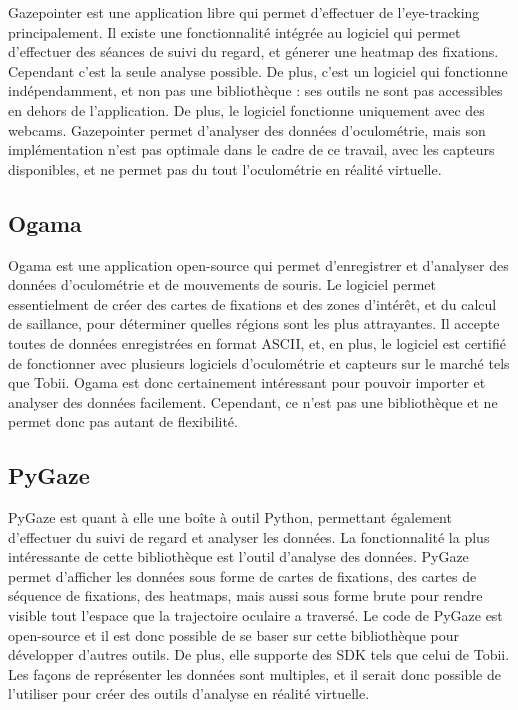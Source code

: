 \documentclass[hidelinks,12pt]{article}
\begin{document}
Gazepointer \cite{gazepointer} est une application libre qui permet d'effectuer
de l'eye-tracking principalement. Il existe une fonctionnalité intégrée au
logiciel qui permet d'effectuer des séances de suivi du regard, et génerer une
heatmap des fixations. Cependant c'est la seule analyse possible. De plus,
c'est un logiciel qui fonctionne indépendamment, et non pas une bibliothèque :
ses outils ne sont pas accessibles en dehors de l'application. De plus, le
logiciel fonctionne uniquement avec des webcams. Gazepointer permet d'analyser
des données d'oculométrie, mais son implémentation n'est pas optimale dans le
cadre de ce travail, avec les capteurs disponibles, et ne permet pas du tout
l'oculométrie en réalité virtuelle.

\subsection{Ogama}

Ogama \cite{ogama} est une application open-source qui permet d'enregistrer et
d'analyser des données d'oculométrie et de mouvements de souris. Le logiciel
permet essentielment de créer des cartes de fixations et des zones d'intérêt,
et du calcul de saillance, pour déterminer quelles régions sont les plus
attrayantes. Il accepte toutes de données enregistrées en format ASCII, et, en
plus, le logiciel est certifié de fonctionner avec plusieurs logiciels
d'oculométrie et capteurs sur le marché tels que Tobii. Ogama est donc
certainement intéressant pour pouvoir importer et analyser des données
facilement. Cependant, ce n'est pas une bibliothèque et ne permet donc pas
autant de flexibilité.

\subsection{PyGaze}

PyGaze \cite{pygaze} est quant à elle une boîte à outil Python, permettant
également d'effectuer du suivi de regard et analyser les données. La
fonctionnalité la plus intéressante de cette bibliothèque est l'outil
d'analyse des données. PyGaze permet d'afficher les données sous forme de
cartes de fixations, des cartes de séquence de fixations, des heatmaps,
mais aussi sous forme brute pour rendre visible tout l'espace que la
trajectoire oculaire a traversé. Le code de PyGaze est open-source et il est
donc possible de se baser sur cette bibliothèque pour développer d'autres
outils. De plus, elle supporte des SDK tels que celui de Tobii. Les façons de
représenter les données sont multiples, et il serait donc possible de
l'utiliser pour créer des outils d'analyse en réalité virtuelle.
\end{document}
